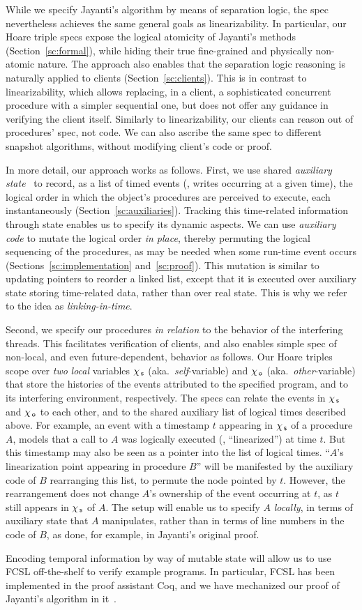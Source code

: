 While we specify Jayanti's algorithm by means of separation logic, the
spec nevertheless achieves the same general goals as
linearizability. In particular, our Hoare triple specs expose the
logical atomicity of Jayanti's methods (Section~\ref{sc:formal}),
while hiding their true fine-grained and physically non-atomic nature.
The approach also enables that the separation logic reasoning is
naturally applied to clients (Section~\ref{sc:clients}). This is in
contrast to linearizability, which allows replacing, in a client, a
sophisticated concurrent procedure with a simpler sequential one,
%
%
but does not offer any guidance in verifying the client itself.
Similarly to linearizability, our clients can reason out of
procedures' spec, not code. We can also ascribe the same spec to
different snapshot algorithms, without modifying client's code or
proof.

In more detail, our approach works as follows. First, we use shared
\emph{auxiliary state}~\cite{OwickiG+CACM76} to record, as a list
of timed events (\eg, writes occurring at a given time), the logical
order in which the object's procedures are perceived to execute, each
instantaneously (Section~\ref{sc:auxiliaries}). Tracking this
time-related information through state enables us to specify its
dynamic aspects. We can use \emph{auxiliary code} to mutate the
logical order \emph{in place}, thereby permuting the logical
sequencing of the procedures, as may be needed when some run-time
event occurs (Sections~\ref{sc:implementation}
and~\ref{sc:proof}). This mutation is similar to updating pointers to
reorder a linked list, except that it is executed over auxiliary state
storing time-related data, rather than over real state. This is why we
refer to the idea as \emph{linking-in-time}.

Second, we specify our procedures \emph{in relation} to the behavior
of the interfering threads. This facilitates verification of clients,
and also enables simple spec of non-local, and even future-dependent,
behavior as follows. Our Hoare triples scope over \emph{two}
\emph{local} variables $\chi_{\, \mathsf{s}}$ (aka.~\emph{self}-variable) and
$\chi_{\, \mathsf{o}}$ (aka.~\emph{other}-variable) that store the histories of the
events attributed to the specified program, and to its interfering
environment, respectively. The specs can relate the events in $\chi_{\, \mathsf{s}}$
and $\chi_{\, \mathsf{o}}$ to each other, and to the shared auxiliary list of
logical times described above. For example, an event with a timestamp
$t$ appearing in $\chi_{\, \mathsf{s}}$ of a procedure $A$, models that a call to
$A$ was logically executed (\ie, ``linearized'') at time $t$. But this
timestamp may also be seen as a pointer into the list of logical
times. ``$A$'s linearization point appearing in procedure $B$'' will
be manifested by the auxiliary code of $B$ rearranging this list, to
permute the node pointed by $t$. However, the rearrangement does not
change $A$'s ownership of the event occurring at $t$, as $t$ still
appears in $\chi_{\, \mathsf{s}}$ of $A$. The setup will enable us to specify $A$
\emph{locally}, in terms of auxiliary state that $A$ manipulates,
rather than in terms of line numbers in the code of $B$, as done, for
example, in Jayanti's original proof.

Encoding temporal information by way of mutable state will allow us to
use FCSL off-the-shelf to verify example programs. In particular, FCSL
has been implemented in the proof assistant Coq, and we have
mechanized our proof of Jayanti's algorithm in it~\cite{CoqFiles}.


